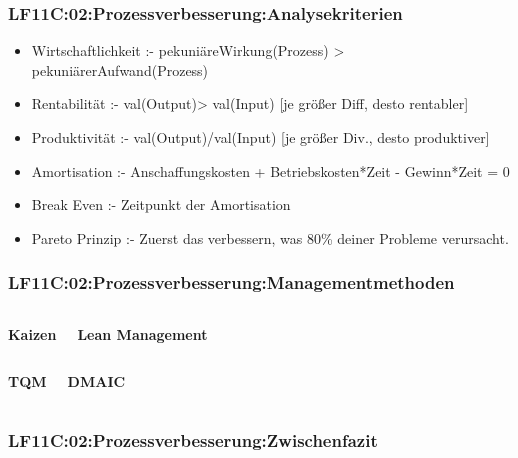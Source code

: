 \begin{frame}  
  \frametitle{LF11C:02:Prozessverbesserung:Analysekriterien}

  \begin{itemize}
    \item Wirtschaftlichkeit :-  {\footnotesize pekuniäreWirkung(Prozess) > pekuniärerAufwand(Prozess)}
    \item Rentabilität :-  {\footnotesize val(Output)> val(Input) [je größer Diff, desto rentabler]}
    \item Produktivität :- {\footnotesize val(Output)/val(Input) [je größer Div., desto produktiver]}
    \item Amortisation :- {\footnotesize Anschaffungskosten + Betriebskosten*Zeit - Gewinn*Zeit = 0}
    \item Break Even :- {\footnotesize Zeitpunkt der Amortisation}
    \item Pareto Prinzip :- {\footnotesize Zuerst das verbessern, was 80\% deiner Probleme verursacht.}
  \end{itemize} 
\end{frame}

\begin{frame}  
  \frametitle{LF11C:02:Prozessverbesserung:Managementmethoden}

  \begin{columns}
    \begin{center}\textbf{Kaizen}\end{center}
    \begin{center}\textbf{Lean Management}\end{center}
  \end{columns}
  \begin{columns}
    \begin{center}\textbf{TQM}\end{center}
    \begin{center}\textbf{DMAIC}\end{center}
  \end{columns}

\end{frame}


\begin{frame}  
  \frametitle{LF11C:02:Prozessverbesserung:Zwischenfazit}


\end{frame}

